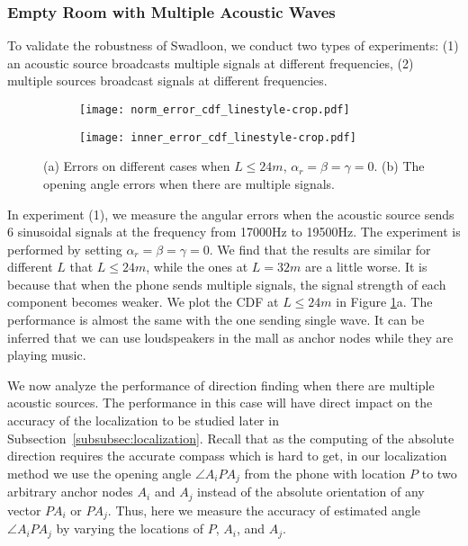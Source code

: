\documentclass[]{sig-alternate-10pt}
\def \ourprotocol{Swadloon\xspace}
\begin{document}
\subsubsection{Empty Room with Multiple Acoustic Waves}

To validate the robustness of \ourprotocol,
 we conduct two types of experiments: (1) an acoustic source broadcasts multiple
 signals at different frequencies, (2) multiple sources
broadcast signals at different frequencies.
 

\begin{figure}[htb]
    \begin{subfigure}[c]{0.235\textwidth}
       \texttt{[image: norm\_error\_cdf\_linestyle-crop.pdf]}
\end{subfigure}
    \begin{subfigure}[c]{0.22\textwidth}
       \texttt{[image: inner\_error\_cdf\_linestyle-crop.pdf]}
\end{subfigure}
        \caption{(a) Errors on different cases when $L\leq
            24m$, $\alpha_r=\beta=\gamma=0$. (b) The opening angle 
        errors when there are multiple signals.}
    \label{fig:errorandinnererror}
\end{figure}

In experiment (1), we measure the angular errors when 
the acoustic source sends 6 sinusoidal signals at the frequency from
17000Hz to 19500Hz. The experiment is performed by setting $\alpha_r=\beta=\gamma=0$. We find that the results are similar for different $L$ that $L\leq 24m$, while the ones at $L=32m$ are a little 
worse. It is
because that when the phone sends multiple signals, the signal
strength of each component becomes weaker.
We plot the CDF at $L\leq24m$ in Figure
 \ref{fig:errorandinnererror}a. The performance is almost the same with the one sending single
wave. It can be inferred that we can use
loudspeakers in the mall as anchor nodes while they are 
playing music.



We now  analyze
 the performance of direction finding when there are multiple acoustic
 sources.
The performance in this case will have direct impact on the accuracy
of the localization to be studied later in
Subsection~\ref{subsubsec:localization}.
Recall that as the computing of the absolute direction requires 
   the accurate compass which is hard to get,
  in our localization method we use the opening angle $\angle A_i P A_j$
   from the phone with location $P$ to two arbitrary anchor nodes
   $A_i$ and $A_j$ instead of the absolute orientation of any vector
   $PA_i$ or $PA_j$.
Thus, here we measure the accuracy of estimated angle $\angle A_i P
 A_j$ by varying the locations of $P$, $A_i$, and $A_j$.
\end{document}
